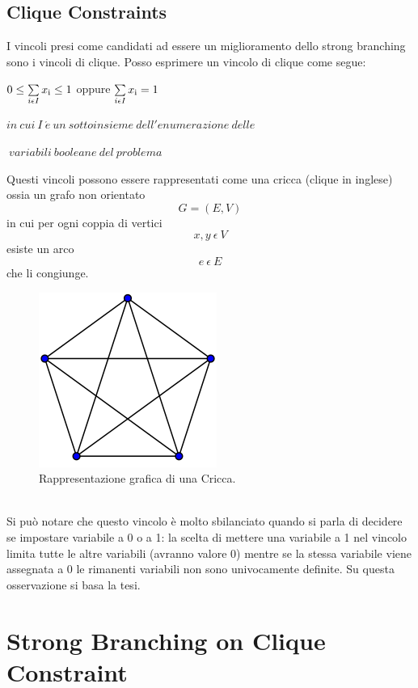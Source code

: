 \documentclass[12pt,a4paper,twoside,openright]{book}
\begin{document}
\section{Clique Constraints}
I vincoli presi come candidati ad essere un miglioramento dello strong branching sono i 
vincoli di clique. Posso esprimere un vincolo di clique come segue:

\begin{center}
    $ 0 \leq \sum\limits_{i \epsilon I}^{} x\textsubscript{i} \leq 1 $  oppure $ \sum\limits_{i \epsilon I}^{} x\textsubscript{i} = 1 $

    $in\:cui\:I\:\acute{e}\:un\:sottoinsieme\:dell'enumerazione\:delle$

    $\:variabili\:booleane\:del\:problema$\linebreak
\end{center}

Questi vincoli possono essere rappresentati come una cricca (clique in inglese) ossia un grafo 
non orientato \[G = (E, V)\] in cui per ogni coppia di vertici \[x,y\:\epsilon\:V\] esiste 
un arco \[e\:\epsilon\:E\] che li congiunge.
\begin{figure}[ht]
    \centering
    \includegraphics [scale = 0.5]{cricca.png}
    \caption{Rappresentazione grafica di una Cricca. }
    \label{fig:cricca}
\end{figure}\\
Si può notare che questo vincolo è molto sbilanciato quando si parla di decidere se impostare
variabile a 0 o a 1: la scelta di mettere una variabile a 1 nel vincolo limita tutte le 
altre variabili (avranno valore 0) mentre se la stessa variabile viene assegnata a 0 le rimanenti variabili 
non sono univocamente definite. Su questa osservazione si basa la tesi.

\chapter{Strong Branching on Clique Constraint}
\end{document}
